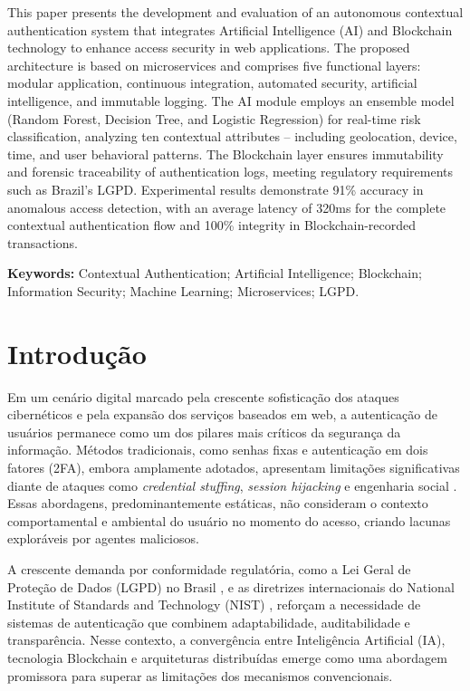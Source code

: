 \documentclass[12pt,a4paper]{article}
\begin{document}
\noindent This paper presents the development and evaluation of an autonomous contextual authentication system that integrates Artificial Intelligence (AI) and Blockchain technology to enhance access security in web applications. The proposed architecture is based on microservices and comprises five functional layers: modular application, continuous integration, automated security, artificial intelligence, and immutable logging. The AI module employs an ensemble model (Random Forest, Decision Tree, and Logistic Regression) for real-time risk classification, analyzing ten contextual attributes -- including geolocation, device, time, and user behavioral patterns. The Blockchain layer ensures immutability and forensic traceability of authentication logs, meeting regulatory requirements such as Brazil's LGPD. Experimental results demonstrate 91\% accuracy in anomalous access detection, with an average latency of 320ms for the complete contextual authentication flow and 100\% integrity in Blockchain-recorded transactions.

\noindent \textbf{Keywords:} Contextual Authentication; Artificial Intelligence; Blockchain; Information Security; Machine Learning; Microservices; LGPD.

\section{Introdução}

Em um cenário digital marcado pela crescente sofisticação dos ataques cibernéticos e pela expansão dos serviços baseados em web, a autenticação de usuários permanece como um dos pilares mais críticos da segurança da informação. Métodos tradicionais, como senhas fixas e autenticação em dois fatores (2FA), embora amplamente adotados, apresentam limitações significativas diante de ataques como \textit{credential stuffing}, \textit{session hijacking} e engenharia social \cite{owasp2023}. Essas abordagens, predominantemente estáticas, não consideram o contexto comportamental e ambiental do usuário no momento do acesso, criando lacunas exploráveis por agentes maliciosos.

A crescente demanda por conformidade regulatória, como a Lei Geral de Proteção de Dados (LGPD) no Brasil \cite{brasil2018}, e as diretrizes internacionais do National Institute of Standards and Technology (NIST) \cite{nist2020}, reforçam a necessidade de sistemas de autenticação que combinem adaptabilidade, auditabilidade e transparência. Nesse contexto, a convergência entre Inteligência Artificial (IA), tecnologia Blockchain e arquiteturas distribuídas emerge como uma abordagem promissora para superar as limitações dos mecanismos convencionais.
\end{document}
